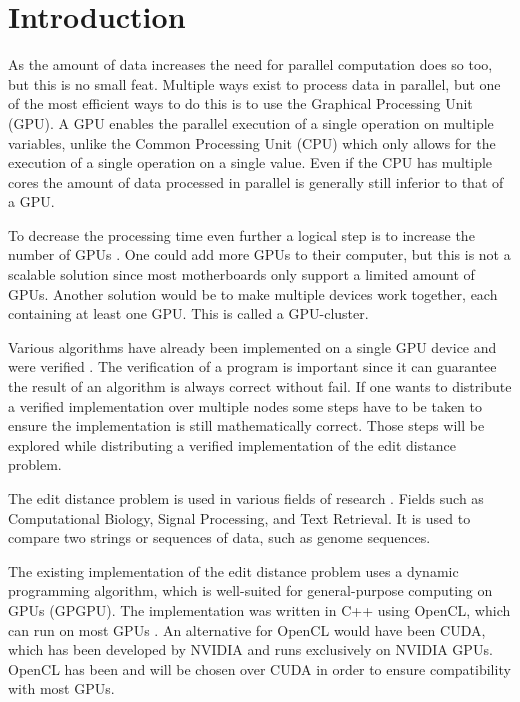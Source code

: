 \documentclass{sig-alternate-br}
\begin{document}


\section{Introduction}
As the amount of data increases the need for parallel computation does so too, but this is no small feat.
Multiple ways exist to process data in parallel, but one of the most efficient ways to do this is to use the Graphical Processing Unit (GPU).
A GPU enables the parallel execution of a single operation on multiple variables, unlike the Common Processing Unit (CPU) which only allows for the execution of a single operation on a single value.
Even if the CPU has multiple cores the amount of data processed in parallel is generally still inferior to that of a GPU.

To decrease the processing time even further a logical step is to increase the number of GPUs \cite{Cluster}.
One could add more GPUs to their computer, but this is not a scalable solution since most motherboards only support a limited amount of GPUs.
Another solution would be to make multiple devices work together, each containing at least one GPU.
This is called a GPU-cluster.

Various algorithms have already been implemented on a single GPU device and were verified \cite{Heus:GPGPU}.
The verification of a program is important since it can guarantee the result of an algorithm is always correct without fail.
If one wants to distribute a verified implementation over multiple nodes some steps have to be taken to ensure the implementation is still mathematically correct.
Those steps will be explored while distributing a verified implementation of the edit distance problem.

The edit distance problem is used in various fields of research \cite{Navarro:2001:GTA:375360.375365}.
Fields such as Computational Biology, Signal Processing, and Text Retrieval.
It is used to compare two strings or sequences of data, such as genome sequences.

The existing implementation of the edit distance problem uses a dynamic programming algorithm, which is well-suited for general-purpose computing on GPUs (GPGPU).
The implementation was written in C++ using OpenCL, which can run on most GPUs \cite{Kronos:conformant}.
An alternative for OpenCL would have been CUDA, which has been developed by NVIDIA and runs exclusively on NVIDIA GPUs.
OpenCL has been and will be chosen over CUDA in order to ensure compatibility with most GPUs.
\end{document}

